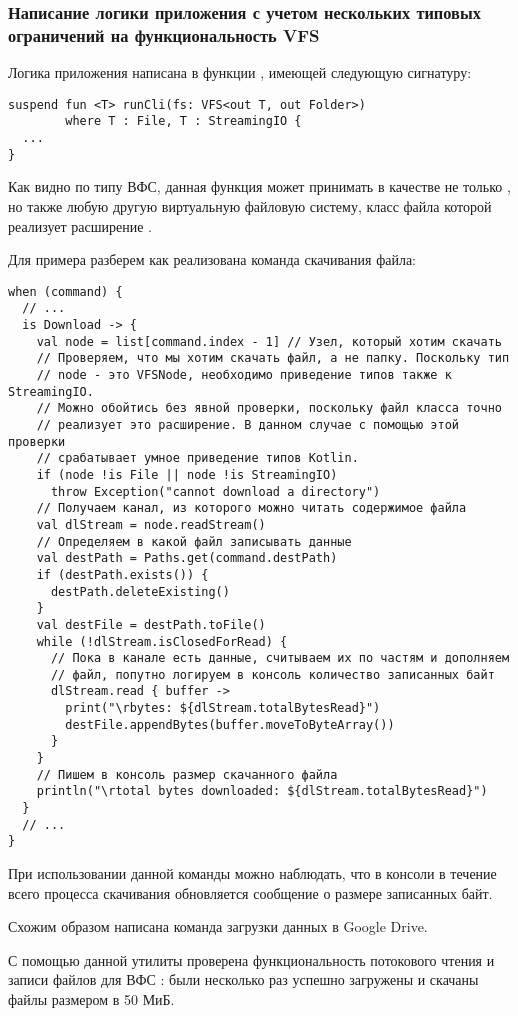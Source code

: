   \subsubsection{Написание логики приложения с учетом нескольких типовых ограничений на функциональность VFS}
    Логика приложения написана в функции , имеющей следующую сигнатуру:
    \begin{verbatim}
suspend fun <T> runCli(fs: VFS<out T, out Folder>)
        where T : File, T : StreamingIO {
  ...
}
    \end{verbatim}
    Как видно по типу ВФС, данная функция может принимать в качестве  не только , но также любую другую виртуальную файловую систему, класс файла которой реализует расширение .

    Для примера разберем как реализована команда скачивания файла:
    \begin{verbatim}
when (command) {      
  // ...
  is Download -> {
    val node = list[command.index - 1] // Узел, который хотим скачать
    // Проверяем, что мы хотим скачать файл, а не папку. Поскольку тип
    // node - это VFSNode, необходимо приведение типов также к StreamingIO.
    // Можно обойтись без явной проверки, поскольку файл класса точно 
    // реализует это расширение. В данном случае с помощью этой проверки 
    // срабатывает умное приведение типов Kotlin.
    if (node !is File || node !is StreamingIO) 
      throw Exception("cannot download a directory")
    // Получаем канал, из которого можно читать содержимое файла
    val dlStream = node.readStream()
    // Определяем в какой файл записывать данные
    val destPath = Paths.get(command.destPath)
    if (destPath.exists()) {
      destPath.deleteExisting()
    }
    val destFile = destPath.toFile()
    while (!dlStream.isClosedForRead) {
      // Пока в канале есть данные, считываем их по частям и дополняем
      // файл, попутно логируем в консоль количество записанных байт
      dlStream.read { buffer ->
        print("\rbytes: ${dlStream.totalBytesRead}")
        destFile.appendBytes(buffer.moveToByteArray())
      }
    }
    // Пишем в консоль размер скачанного файла
    println("\rtotal bytes downloaded: ${dlStream.totalBytesRead}")
  }
  // ...
}
    \end{verbatim}

    При использовании данной команды можно наблюдать, что в консоли в течение всего процесса скачивания обновляется сообщение о размере записанных байт. 
    
    Схожим образом написана команда загрузки данных в Google Drive. 

    С помощью данной утилиты проверена функциональность потокового чтения и записи файлов для ВФС : были несколько раз успешно загружены и скачаны файлы размером в 50 МиБ.

